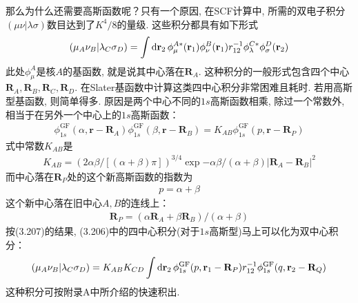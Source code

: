 那么为什么还需要高斯函数呢？只有一个原因, 在SCF计算中, 所需的双电子积分$(\mu\nu|\lambda\sigma)$数目达到了$K^4/8$的量级. 这些积分都具有如下形式
\begin{align}
(\mu_A\nu_B|\lambda_C\sigma_D) = \int\dd{r}_2\,\phi_\mu^{A*}(\bfr_1)\phi_\nu^B(\bfr_1)\twoe\phi_\lambda^{C*}\phi_\sigma^D(\bfr_2)
\end{align}
此处$\phi_\mu^A$是核$A$的基函数, 就是说其中心落在$\mathbf{R}_A$. 这种积分的一般形式包含四个中心$\mathbf{R}_A,\mathbf{R}_B,\mathbf{R}_C,\mathbf{R}_D$. 在Slater基函数中计算这类四中心积分非常困难且耗时. 若用高斯型基函数, 则简单得多. 原因是两个中心不同的$1s$高斯函数相乘, 除过一个常数外, 相当于在另外一个中心上的$1s$高斯函数：
\begin{align}
\label{3.207}
\phi_{1s}^\mathrm{GF}(\alpha,\mathbf{r-R}_A)\phi_{1s}^\mathrm{GF}(\beta,\mathbf{r-R}_B) = K_{AB}\phi_{1s}^\mathrm{GF}(p,\mathbf{r-R}_P)
\end{align}
式中常数$K_{AB}$是
\begin{align}
K_{AB} = (2\alpha\beta/[(\alpha+\beta)\pi])^{3/4}\exp{-\alpha\beta/(\alpha+\beta)|\mathbf{R}_A-\mathbf{R}_B|^2}
\end{align}
而中心落在$\mathbf{R}_P$处的这个新高斯函数的指数为
\begin{align}
p=\alpha+\beta
\end{align}
这个新中心落在旧中心$A,B$的连线上：
\begin{align}
\mathbf{R}_P = (\alpha\mathbf{R}_A+\beta\mathbf{R}_B)/(\alpha+\beta)
\end{align}
按(3.207)的结果, (3.206)中的四中心积分(对于$1s$高斯型)马上可以化为双中心积分：
\begin{align}
(\mu_A\nu_B|\lambda_C\sigma_D) =K_{AB}K_{CD} \int\dd{r}_2\,\phi_{1s}^\mathrm{GF}(p,\bfr_1-\mathbf{R}_P)\twoe\phi_{1s}^\mathrm{GF}(q,\bfr_2-\mathbf{R}_Q)
\end{align}
这种积分可按附录A中所介绍的快速积出.

